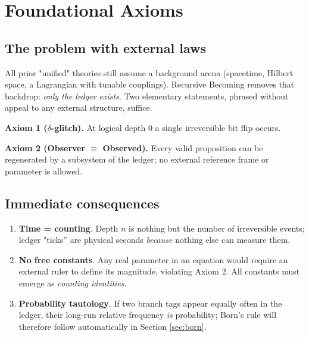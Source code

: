 \section{Foundational Axioms}
\label{sec:axioms}

\subsection{The problem with external laws}

All prior "unified" theories still assume a background arena
(spacetime, Hilbert space, a Lagrangian with tunable couplings).
Recursive Becoming removes that backdrop: \emph{only the ledger
exists}.  Two elementary statements, phrased without appeal to any
external structure, suffice.

\begin{axiombox}
\textbf{Axiom 1 ($\delta$-glitch).}  
At logical depth 0 a single irreversible bit flip occurs.
\end{axiombox}

\begin{axiombox}
\textbf{Axiom 2 (Observer $\boldsymbol{\equiv}$ Observed).}  
Every valid proposition can be regenerated by a subsystem of the
ledger; no external reference frame or parameter is allowed.
\end{axiombox}

\subsection{Immediate consequences}

\begin{enumerate}
  \item \textbf{Time = counting}.  Depth $n$ is nothing but the number
        of irreversible events; ledger "ticks'' are physical seconds
        \emph{because} nothing else can measure them.
  \item \textbf{No free constants}.  Any real parameter in an equation
        would require an external ruler to define its magnitude,
        violating Axiom 2.  All constants must emerge as
        \emph{counting identities}.
  \item \textbf{Probability tautology}.  If two branch tags appear
        equally often in the ledger, their long-run relative frequency
        \emph{is} probability; Born's rule will therefore follow
        automatically in Section \ref{sec:born}.
\end{enumerate}

